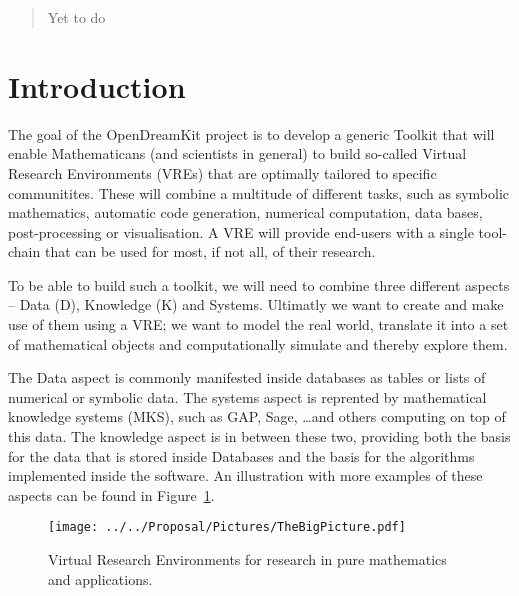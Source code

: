 \documentclass{deliverablereport}
\author{Michael Kohlhase}
\author{Florian Rabe}
\author{Tom Wiesing}
\author{Paul-Olivier Dehaye}
\begin{document}
\maketitle\vfill

\begin{abstract}
Yet to do
\end{abstract}

\vfill

\newpage\tableofcontents\newpage


\section{Introduction}\label{sec:intro}

The goal of the OpenDreamKit project \cite{ODKproposal:on} is to develop a generic Toolkit that will enable Mathematicans (and scientists in general) to build so-called Virtual Research Environments (VREs) that are optimally tailored to specific communitites. These will combine a multitude of different tasks, such as symbolic mathematics, automatic code generation, numerical computation, data bases, post-processing or visualisation. A VRE will provide end-users with a single tool-chain that can be used for most, if not all, of their research.

To be able to build such a toolkit, we will need to combine three different aspects -- Data (D), Knowledge (K) and Systems. Ultimatly we want to create and make use of them using a VRE; we want to model the real world, translate it into a set of mathematical objects and computationally simulate and thereby explore them.

The Data aspect is commonly manifested inside databases as tables or lists of numerical or symbolic data. The systems aspect is reprented by mathematical knowledge systems (MKS), such as GAP, Sage, \dots and others computing on top of this data. The knowledge aspect is in between these two, providing both the basis for the data that is stored inside Databases and the basis for the algorithms implemented inside the software. An illustration with more examples of these aspects can be found in Figure~\ref{fig:thebigpicture}.

\begin{figure}[H]
  \centerline{\texttt{[image: ../../Proposal/Pictures/TheBigPicture.pdf]}}
  \caption{Virtual Research Environments for research in pure
    mathematics and applications.}
  \label{fig:thebigpicture}
\end{figure}
\end{document}
